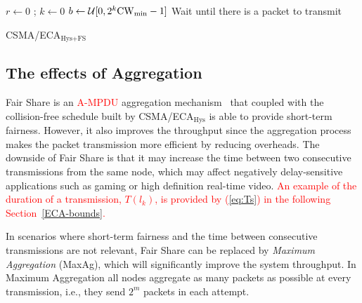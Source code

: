 	\begin{algorithm}[tb]
	{
	  $r \leftarrow 0$ ; $k \leftarrow 0$\;
	  $b \leftarrow \mathcal{U}[0,2^k\rm{CW}_{min}-1]$\;
	  Wait until there is a packet to transmit\;
	}	
	\vspace{0.2cm}
	\caption{CSMA/ECA$_{\text{Hys+FS}}$}
	\label{alg:fullECA}
	\end{algorithm}


	\subsection{The effects of Aggregation}\label{effects-of-aggregation}
	Fair Share is an \textcolor{red}{A-MPDU} aggregation mechanism~\cite{A-MPDU} that coupled with the collision-free schedule built by CSMA/ECA$_{\text{Hys}}$ is able to provide short-term fairness. However, it also improves the throughput since the aggregation process makes the packet transmission more efficient by reducing overheads. The downside of Fair Share is that it may increase the time between two consecutive transmissions from the same node, which may affect negatively delay-sensitive applications such as gaming or high definition real-time video. \textcolor{red}{An example of the duration of a transmission, $T(l_{k})$, is provided by (\ref{eq:Ts}) in the following Section~\ref{ECA-bounds}.}
	
	In scenarios where short-term fairness and the time between consecutive transmissions are not relevant, Fair Share can be replaced by \emph{Maximum Aggregation} (MaxAg), which will significantly improve the system throughput. In Maximum Aggregation all nodes aggregate as many packets as possible at every transmission, i.e., they send $2^m$ packets in each attempt.


